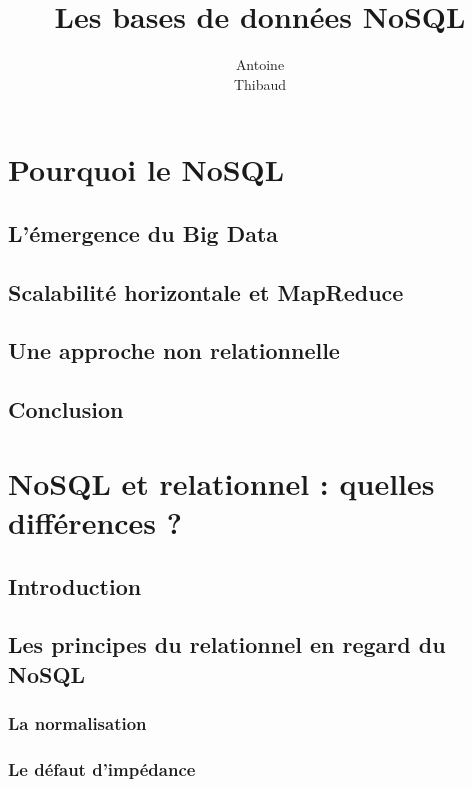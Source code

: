 \documentclass[12pt,titlepage,a4paper]{report}
\title{Les bases de données NoSQL}
\author{Antoine \bsc{Augusti}\\ Thibaud \bsc{Dauce}}
\begin{document}
	\dominitoc
	\tableofcontents

	\chapter{Pourquoi le NoSQL}
	\minitoc

		\section{L'émergence du Big Data}
			

		\section{Scalabilité horizontale et MapReduce}
			

		\section{Une approche non relationnelle}
			

		\section*{Conclusion}
			

	\chapter{NoSQL et relationnel : quelles différences ?}
	\minitoc

		\section*{Introduction}
			

		\section{Les principes du relationnel en regard du NoSQL}
			\subsection{La normalisation}
			\subsection{Le défaut d'impédance}
\end{document}
